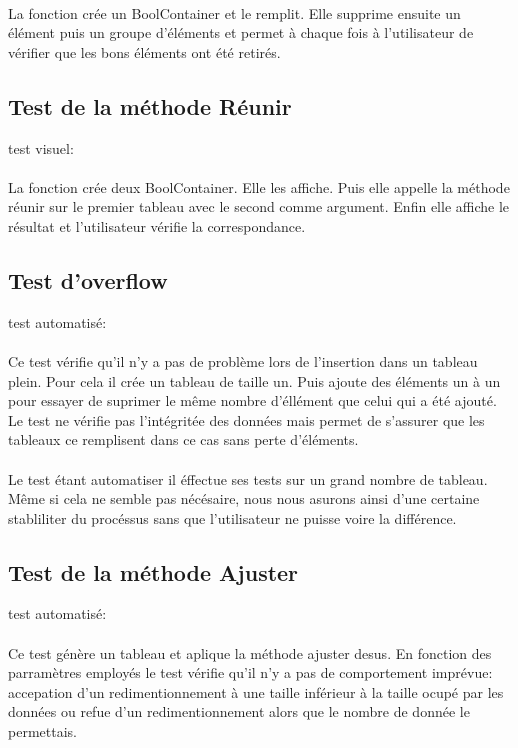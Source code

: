 \documentclass[a4paper, 12pts]{article}
\begin{document}
\paragraph{}
La fonction crée un BoolContainer et le remplit. Elle supprime ensuite un élément puis un groupe d’éléments et permet à chaque fois à l’utilisateur de vérifier que les bons éléments ont été retirés.

\subsection{Test de la méthode Réunir}
test visuel:
\paragraph{}
La fonction crée deux BoolContainer. Elle les affiche. Puis elle appelle la méthode réunir sur le premier tableau avec le second comme argument. Enfin elle affiche le résultat et l’utilisateur vérifie la correspondance.

\subsection{Test d'overflow}
test automatisé:
\paragraph{}
Ce test vérifie qu'il n'y a pas de problème lors de l'insertion dans un tableau plein. Pour cela il crée un tableau de taille un. Puis ajoute des éléments un à un pour essayer de suprimer le même nombre d'éllément que celui qui a été ajouté. Le test ne vérifie pas l'intégritée des données mais permet de s'assurer que les tableaux ce remplisent dans ce cas sans perte d'éléments.
\paragraph{}
Le test étant automatiser il éffectue ses tests sur un grand nombre de tableau. Même si cela ne semble pas nécésaire, nous nous asurons ainsi d'une certaine stabliliter du procéssus sans que l'utilisateur ne puisse voire la différence.

\subsection{Test de la méthode Ajuster}
test automatisé:
\paragraph{}
Ce test génère un tableau et aplique la méthode ajuster desus. En fonction des parramètres employés le test vérifie qu'il n'y a pas de comportement imprévue: accepation d'un redimentionnement à une taille inférieur à la taille ocupé par les données ou refue d'un redimentionnement alors que le nombre de donnée le permettais.
\end{document}
